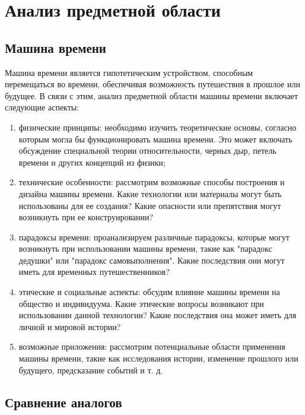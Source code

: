 
\section{Анализ предметной области}

\subsection{Машина времени}

Машина времени является гипотетическим устройством, способным перемещаться во времени, обеспечивая возможность путешествия в прошлое или будущее. В связи с этим, анализ предметной области машины времени включает следующие аспекты:


\begin{enumerate}
	\item физические принципы: необходимо изучить теоретические основы, согласно которым могла бы функционировать машина времени. Это может включать обсуждение специальной теории относительности, черных дыр, петель времени и других концепций из физики;

	\item технические особенности: рассмотрим возможные способы построения и дизайна машины времени. Какие технологии или материалы могут быть использованы для ее создания? Какие опасности или препятствия могут возникнуть при ее конструировании?

	\item парадоксы времени: проанализируем различные парадоксы, которые могут возникнуть при использовании машины времени, такие как "парадокс дедушки" или "парадокс самовыполнения". Какие последствия они могут иметь для временных путешественников?

	\item этические и социальные аспекты: обсудим влияние машины времени на общество и индивидуума. Какие этические вопросы возникают при использовании данной технологии? Какие последствия она может иметь для личной и мировой истории?

	\item возможные приложения: рассмотрим потенциальные области применения машины времени, такие как исследования истории, изменение прошлого или будущего, предсказание событий и т. д.
\end{enumerate}

\subsection{Сравнение аналогов}

